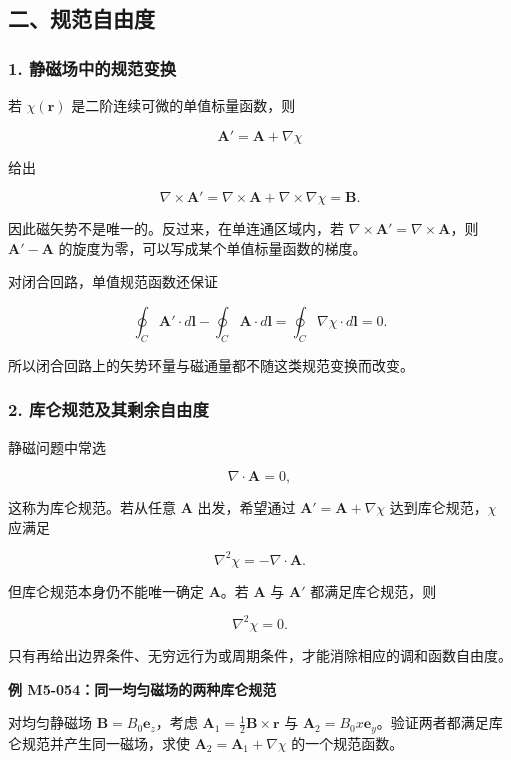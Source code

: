 \subsection{二、规范自由度}\label{m5:ux4e8cux89c4ux8303ux81eaux7531ux5ea6}

\subsubsection{1.
静磁场中的规范变换}\label{m5:ux9759ux78c1ux573aux4e2dux7684ux89c4ux8303ux53d8ux6362}

若 \(\chi(\mathbf r)\) 是二阶连续可微的单值标量函数，则

\[
\mathbf A'=\mathbf A+\nabla\chi
\]

给出

\[
\nabla\times\mathbf A'
=\nabla\times\mathbf A+\nabla\times\nabla\chi
=\mathbf B.
\]

因此磁矢势不是唯一的。反过来，在单连通区域内，若
\(\nabla\times\mathbf A'=\nabla\times\mathbf A\)，则
\(\mathbf A'-\mathbf A\) 的旋度为零，可以写成某个单值标量函数的梯度。

对闭合回路，单值规范函数还保证

\[
\oint_C\mathbf A'\cdot d\mathbf l
-\oint_C\mathbf A\cdot d\mathbf l
=\oint_C\nabla\chi\cdot d\mathbf l=0.
\]

所以闭合回路上的矢势环量与磁通量都不随这类规范变换而改变。

\subsubsection{2.
库仑规范及其剩余自由度}\label{m5:ux5e93ux4ed1ux89c4ux8303ux53caux5176ux5269ux4f59ux81eaux7531ux5ea6}

静磁问题中常选

\[
\boxed{\nabla\cdot\mathbf A=0},
\]

这称为库仑规范。若从任意 \(\mathbf A\) 出发，希望通过
\(\mathbf A'=\mathbf A+\nabla\chi\) 达到库仑规范，\(\chi\) 应满足

\[
\nabla^2\chi=-\nabla\cdot\mathbf A.
\]

但库仑规范本身仍不能唯一确定 \(\mathbf A\)。若 \(\mathbf A\) 与
\(\mathbf A'\) 都满足库仑规范，则

\[
\nabla^2\chi=0.
\]

只有再给出边界条件、无穷远行为或周期条件，才能消除相应的调和函数自由度。

\par{}
\noindent\begin{minipage}{\linewidth}

\textbf{例 M5-054：同一均匀磁场的两种库仑规范}

对均匀静磁场 \(\mathbf B=B_0\mathbf e_z\)，考虑
\(\mathbf A_1=\tfrac12\mathbf B\times\mathbf r\) 与
\(\mathbf A_2=B_0x\mathbf e_y\)。验证两者都满足库仑规范并产生同一磁场，求使
\(\mathbf A_2=\mathbf A_1+\nabla\chi\) 的一个规范函数。

\end{minipage}\par

